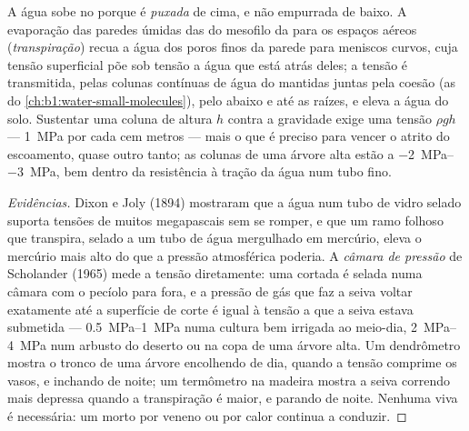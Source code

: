 \begin{theorem}\label{thm:b1:plant-transport:cohesiontension}
A água sobe no  porque é \emph{puxada} de cima, e não empurrada
de baixo. A evaporação das paredes úmidas das  do mesofilo da
 para os espaços aéreos (\emph{transpiração}) recua a água dos
poros finos da parede para meniscos curvos, cuja tensão superficial
põe sob tensão a água que está atrás deles; a tensão é transmitida,
pelas colunas contínuas de água do  mantidas juntas pela coesão
(as  do
\cref{ch:b1:water-small-molecules}), pelo  abaixo e até as
raízes, e eleva a água do solo. Sustentar uma coluna de altura $h$
contra a gravidade exige uma tensão $\rho g h$ --- \qty{1}{MPa} por
cada cem metros --- mais o que é preciso para vencer o atrito do
escoamento, quase outro tanto; as colunas de uma árvore alta estão a
\qtyrange{-2}{-3}{MPa}, bem dentro da resistência à tração da água num
tubo fino.
\end{theorem}
\begin{proof}[Evidências]
Dixon e Joly (1894) mostraram que a água num tubo de vidro selado
suporta tensões de muitos megapascais sem se romper, e que um ramo
folhoso que transpira, selado a um tubo de água mergulhado em
mercúrio, eleva o mercúrio mais alto do que a pressão atmosférica
poderia. A \emph{câmara de pressão} de Scholander (1965) mede a tensão
diretamente: uma  cortada é selada numa câmara com o pecíolo para
fora, e a pressão de gás que faz a seiva voltar exatamente até a
superfície de corte é igual à tensão a que a seiva estava submetida
--- \qtyrange{0.5}{1}{MPa} numa cultura bem irrigada ao meio-dia,
\qtyrange{2}{4}{MPa} num arbusto do deserto ou na copa de uma árvore
alta. Um dendrômetro mostra o tronco de uma árvore encolhendo de dia,
quando a tensão comprime os vasos, e inchando de noite; um termômetro
na madeira mostra a seiva correndo mais depressa quando a transpiração
é maior, e parando de noite. Nenhuma  viva é necessária: um
 morto por veneno ou por calor continua a conduzir.
\end{proof}

